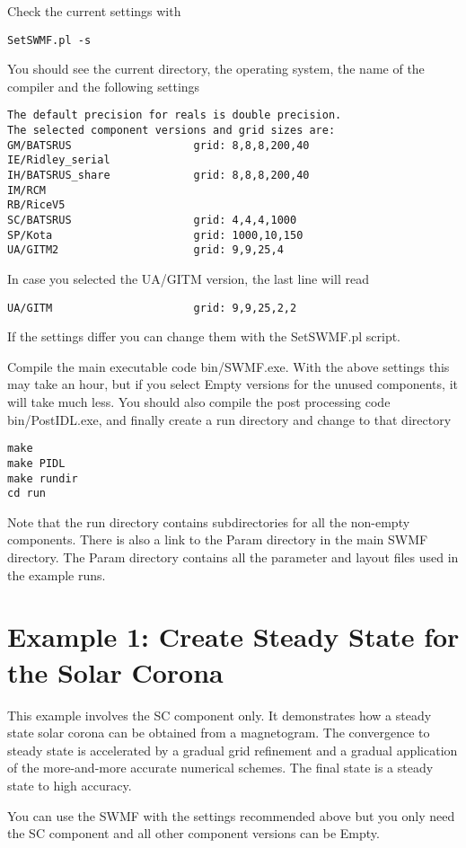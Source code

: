 Check the current settings with
\begin{verbatim}
SetSWMF.pl -s
\end{verbatim}
You should see the current directory, the operating system, the name
of the compiler and the following settings
\begin{verbatim}
The default precision for reals is double precision.
The selected component versions and grid sizes are:
GM/BATSRUS                   grid: 8,8,8,200,40
IE/Ridley_serial             
IH/BATSRUS_share             grid: 8,8,8,200,40
IM/RCM                       
RB/RiceV5                    
SC/BATSRUS                   grid: 4,4,4,1000
SP/Kota                      grid: 1000,10,150
UA/GITM2                     grid: 9,9,25,4
\end{verbatim}
In case you selected the UA/GITM version, the last line will read
\begin{verbatim}
UA/GITM                      grid: 9,9,25,2,2
\end{verbatim}
If the settings differ you can change them with the SetSWMF.pl script.

Compile the main executable code bin/SWMF.exe. With the above
settings this may take an hour, but if you select Empty versions
for the unused components, it will take much less.
You should also compile the post processing code bin/PostIDL.exe,
and finally create a run directory and change to that directory
\begin{verbatim}
make
make PIDL
make rundir
cd run
\end{verbatim}
Note that the run directory contains subdirectories for all the
non-empty components. There is also a link to the Param directory
in the main SWMF directory. The Param directory contains all the
parameter and layout files used in the example runs.

\section{Example 1: Create Steady State for the Solar Corona}

This example involves the SC component only. It demonstrates
how a steady state solar corona can be obtained from
a magnetogram. The convergence to steady state is accelerated by 
a gradual grid refinement and a gradual application of the
more-and-more accurate numerical schemes. The final state
is a steady state to high accuracy. 

You can use the SWMF with the settings recommended above
but you only need the SC component and
all other component versions can be Empty.

